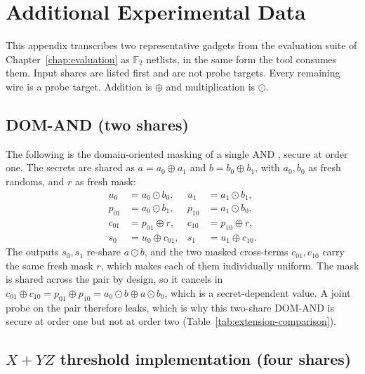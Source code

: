 \chapter{Additional Experimental Data}
\label{app:netlists}

This appendix transcribes two representative gadgets from the evaluation suite of
Chapter~\ref{chap:evaluation} as $\mathbb{F}_2$ netlists, in the same form the tool
consumes them. Input shares are listed first and are not probe targets. Every
remaining wire is a probe target. Addition is $\oplus$ and multiplication is $\odot$.

\section{DOM-AND (two shares)}

The following is the domain-oriented masking of a single AND \parencite{gross2016domain}, secure at
order one. The secrets are shared as $a = a_0 \oplus a_1$ and $b = b_0 \oplus b_1$,
with $a_0, b_0$ as fresh randoms, and $r$ as fresh mask:
\[
\begin{aligned}
  u_0 &= a_0 \odot b_0, & u_1 &= a_1 \odot b_1, \\
  p_{01} &= a_0 \odot b_1, & p_{10} &= a_1 \odot b_0, \\
  c_{01} &= p_{01} \oplus r, & c_{10} &= p_{10} \oplus r, \\
  s_0 &= u_0 \oplus c_{01}, & s_1 &= u_1 \oplus c_{10}.
\end{aligned}
\]
The outputs $s_0, s_1$ re-share $a \odot b$, and the two masked cross-terms
$c_{01}, c_{10}$ carry the same fresh mask $r$, which makes each of them
individually uniform. The mask is shared across the pair by design, so it cancels
in $c_{01} \oplus c_{10} = p_{01} \oplus p_{10} = a_0 \odot b \oplus a \odot b_0$,
which is a secret-dependent value. A joint probe on the pair therefore leaks, which is why
this two-share DOM-AND is secure at order one but not at order two
(Table~\ref{tab:extension-comparison}).

\section{\texorpdfstring{$X + YZ$}{X + YZ} threshold implementation (four shares)}

